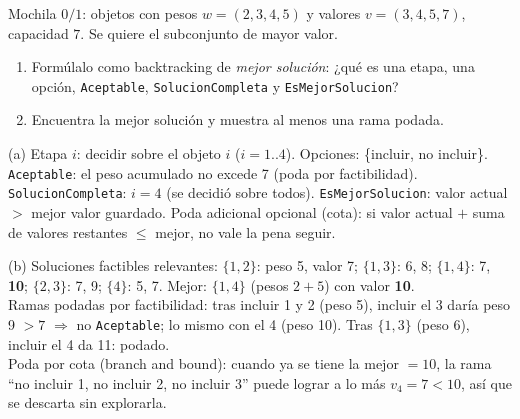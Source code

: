 \begin{prob}[\simil]
Mochila $0/1$: objetos con pesos $w=(2,3,4,5)$ y valores $v=(3,4,5,7)$, capacidad $7$. Se quiere el subconjunto de mayor valor.
\begin{enumerate}[label=(\alph*)]
\item Formúlalo como backtracking de \emph{mejor solución}: ¿qué es una etapa, una opción, \texttt{Aceptable}, \texttt{SolucionCompleta} y \texttt{EsMejorSolucion}?
\item Encuentra la mejor solución y muestra al menos una rama podada.
\end{enumerate}
\end{prob}
\begin{sol}
(a) Etapa $i$: decidir sobre el objeto $i$ ($i=1..4$). Opciones: \{incluir, no incluir\}. \texttt{Aceptable}: el peso acumulado no excede 7 (poda por factibilidad). \texttt{SolucionCompleta}: $i=4$ (se decidió sobre todos). \texttt{EsMejorSolucion}: valor actual $>$ mejor valor guardado. Poda adicional opcional (cota): si valor actual $+$ suma de valores restantes $\le$ mejor, no vale la pena seguir.

(b) Soluciones factibles relevantes: $\{1,2\}$: peso 5, valor 7; $\{1,3\}$: 6, 8; $\{1,4\}$: 7, \textbf{10}; $\{2,3\}$: 7, 9; $\{4\}$: 5, 7. Mejor: $\{1,4\}$ (pesos $2+5$) con valor \textbf{10}.\\
Ramas podadas por factibilidad: tras incluir 1 y 2 (peso 5), incluir el 3 daría peso 9 $>7$ $\Rightarrow$ no \texttt{Aceptable}; lo mismo con el 4 (peso 10). Tras $\{1,3\}$ (peso 6), incluir el 4 da 11: podado.\\
Poda por cota (branch and bound): cuando ya se tiene la mejor $=10$, la rama ``no incluir 1, no incluir 2, no incluir 3'' puede lograr a lo más $v_4=7<10$, así que se descarta sin explorarla.
\end{sol}

